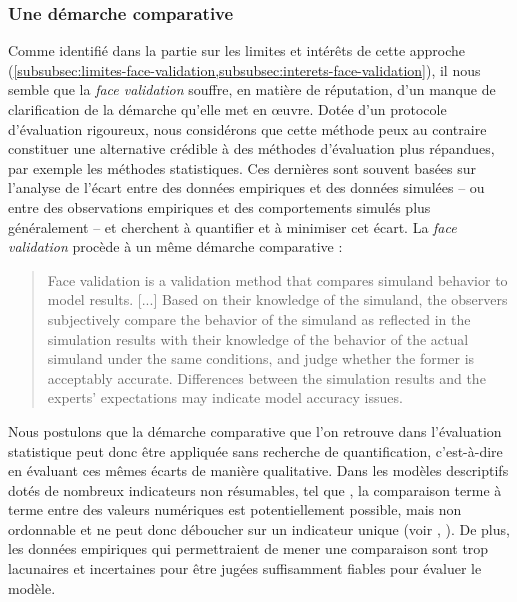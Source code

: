 \subsubsection{Une démarche comparative}
Comme identifié dans la partie sur les limites et intérêts de cette approche (\cref{subsubsec:limites-face-validation,subsubsec:interets-face-validation}), il nous semble que la \textit{face validation} souffre, en matière de réputation, d'un manque de clarification de la démarche qu'elle met en œuvre.
Dotée d'un protocole d'évaluation rigoureux, nous considérons que cette méthode peux au contraire constituer une alternative crédible à des méthodes d'évaluation plus répandues, par exemple les méthodes statistiques.
Ces dernières sont souvent basées sur l'analyse de l'écart entre des données empiriques et des données simulées -- ou entre des observations empiriques et des comportements simulés plus généralement -- et cherchent à quantifier et à minimiser cet écart.
La \textit{face validation} procède à un même démarche comparative :
\begin{quotation}
		\noindent \og Face validation is a validation method that compares simuland behavior to model results. [...] Based on their knowledge of the simuland, the observers subjectively compare the behavior of the simuland as reflected in the simulation results with their knowledge of the behavior of the actual simuland under the same conditions, and judge whether the former is acceptably accurate. Differences between the simulation results and the experts' expectations may indicate model accuracy issues.
	\mbox{}~ \hfill \textcite[341]{petty2010verification}
\end{quotation}
Nous postulons que la démarche comparative que l'on retrouve dans l'évaluation statistique peut donc être appliquée sans recherche de quantification, c'est-à-dire en évaluant ces mêmes écarts de manière qualitative.
Dans les modèles descriptifs dotés de nombreux indicateurs non résumables, tel que \simfeodal{}, la comparaison terme à terme entre des valeurs numériques est potentiellement possible, mais non ordonnable et ne peut donc déboucher sur un indicateur unique (voir , ).
De plus, les données empiriques qui permettraient de mener une comparaison sont trop lacunaires et incertaines pour être jugées suffisamment fiables pour évaluer le modèle.

